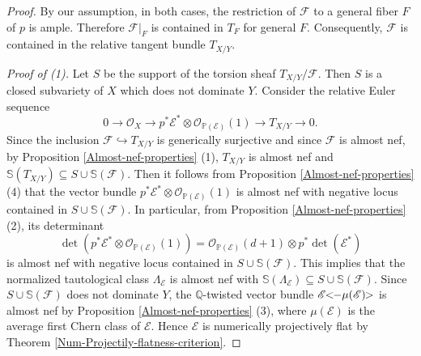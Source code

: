 \documentclass[english,reqno]{amsart}
\newcommand\bbP{{\mathbb P}}
\newcommand\bbQ{{\mathbb Q}}
\newcommand\bbS{{\mathbb S}}
\newcommand\sE{{\mathscr E}}
\newcommand\sF{{\mathscr F}}
\newcommand\sO{{\mathscr O}}
\theoremstyle{plain}
\theoremstyle{definition}
\numberwithin{equation}{section} %
\begin{document}
\begin{proof}
	By our assumption, in both cases, the restriction of $\sF$ to a general fiber $F$ of $p$ is ample. Therefore $\sF\vert_F$ is contained in $T_F$ for general $F$. Consequently, $\sF$ is contained in the relative tangent bundle $T_{X/Y}$.
	
    \textit{Proof of (1).} Let $S$ be the support of the torsion sheaf $T_{X/Y}/\sF$. Then $S$ is a closed  subvariety of $X$ which does not dominate $Y$. Consider the relative Euler sequence
    \begin{equation}
    \label{eq:relative-euler-sequence-proof-PF}
    0\rightarrow \sO_X\rightarrow p^*\sE^*\otimes\sO_{\bbP(\sE)}(1)\rightarrow T_{X/Y}\rightarrow 0.
    \end{equation}
    Since the inclusion $\sF\hookrightarrow T_{X/Y}$ is generically surjective and since $\sF$ is almost nef, by Proposition \ref{Almost-nef-properties} (1), $T_{X/Y}$ is almost nef and $\bbS(T_{X/Y})\subseteq S\cup\bbS(\sF)$.
    Then it follows from Proposition \ref{Almost-nef-properties} (4) that the vector bundle $p^*\sE^*\otimes\sO_{\bbP(\sE)}(1)$ is almost nef with negative locus contained in $S\cup \bbS(\sF)$. In particular, from Proposition \ref{Almost-nef-properties} (2), its determinant
    \[\det(p^*\sE^*\otimes\sO_{\bbP(\sE)}(1))=\sO_{\bbP(\sE)}(d+1)\otimes p^*\det(\sE^*)\]
    is almost nef with negative locus contained in $S\cup \bbS(\sF)$.
    This implies that the normalized tautological class $\Lambda_{\sE}$ is almost nef with $\bbS(\Lambda_{\sE})\subseteq S\cup\bbS(\sF)$.
    Since   $S\cup \bbS(\sF)$ does not dominate $Y$, the $\bbQ$-twisted vector bundle $\sE\hspace{-0.8ex}<\hspace{-0.8ex}-\mu(\sE) \hspace{-0.8ex}>$ is almost nef by Proposition \ref{Almost-nef-properties} (3), where $\mu(\sE)$ is the average first Chern class of $\sE$.
    Hence $\sE$ is numerically projectively flat by Theorem \ref{Num-Projectily-flatness-criterion}.







\end{proof}
\end{document}
